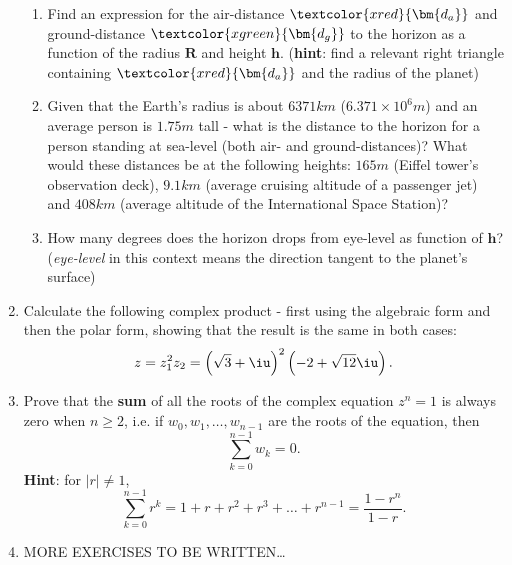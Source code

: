 \begin{enumerate}
		\begin{center}
		\end{center}

		\begin{enumerate}[label=(\roman*)]
			\item Find an expression for the air-distance $\textcolor{xred}{\bm{d_{a}}}$ and ground-distance $\textcolor{xgreen}{\bm{d_{g}}}$ to the horizon as a function of the radius $\bm{R}$ and height $\bm{h}$. (\textbf{hint}: find a relevant right triangle containing $\textcolor{xred}{\bm{d_{a}}}$ and the radius of the planet)
			\item Given that the Earth's radius is about $6371\si{km}$ ($6.371\times10^{6}\si{m}$) and an average person is $1.75\si{m}$ tall - what is the distance to the horizon for a person standing at sea-level (both air- and ground-distances)? What would these distances be at the following heights: $165\si{m}$ (Eiffel tower's observation deck), $9.1\si{km}$ (average cruising altitude of a passenger jet) and $408\si{km}$ (average altitude of the International Space Station)?
			\item How many degrees does the horizon drops from eye-level as function of $\bm{h}$? (\textit{eye-level} in this context means the direction tangent to the planet's surface)
		\end{enumerate}

	\item Calculate the following complex product - first using the algebraic form and then the polar form, showing that the result is the same in both cases:
		\[
			z = z_{1}^{2}z_{2} = \left( \sqrt{3}+\iu \right)^{2} \left( -2+\sqrt{12}\iu \right).
		\]

	\item Prove that the \textbf{sum} of all the roots of the complex equation $z^{n}=1$ is always zero when $n\geq2$, i.e. if $w_{0},w_{1},\dots,w_{n-1}$ are the roots of the equation, then
		\[
			\sum\limits_{k=0}^{n-1}w_{k} = 0.
		\]
		\textbf{Hint}: for $|r|\neq1$,
		\[
			\sum\limits_{k=0}^{n-1}r^{k} = 1 + r + r^{2} + r^{3} + \dots + r^{n-1} = \frac{1-r^{n}}{1-r}.
		\]

	\item MORE EXERCISES TO BE WRITTEN\ldots
\end{enumerate}

